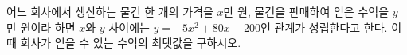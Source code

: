 어느 회사에서 생산하는 물건 한 개의 가격을 $x$만 원, 물건을 판매하여 얻은 수익을 $y$만 원이라 하면 $x$와 $y$ 사이에는 $y=-5x^2+80x-200$인 관계가 성립한다고 한다. 이때 회사가 얻을 수 있는 수익의 최댓값을 구하시오.

